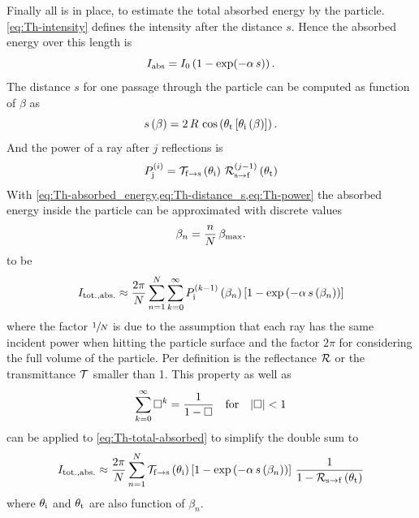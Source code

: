 Finally all is in place, to estimate the total absorbed energy by the particle. 
\cref{eq:Th-intensity} defines the intensity after the distance $s$. Hence the 
absorbed energy over this length is
\begin{equation}
    I_{\mathrm{abs}} = I_{0} \left( 1 - \exp(-\alpha\,s) \right).
    \label{eq:Th-absorbed_energy}
\end{equation}
The distance $s$ for one passage through the particle can be computed as 
function of $\beta$ as
\begin{equation}
  s\left( \beta \right) = 2\,R\,\cos\left( \theta_{\mathrm{t}}\left[ \theta_{\mathrm{i}}\left( 
    \beta \right) \right]
    \right).
    \label{eq:Th-distance_s}
\end{equation}
And the power of a ray after $j$ reflections is
\begin{equation}
  P_{\mathrm{j}}^{(i)} =
  \mathcal{T}_{\mathrm{f}\rightarrow\mathrm{s}}\left( \theta_{\mathrm{i}} \right) \,
  \mathcal{R}^{(j-1)}_{\mathrm{s}\rightarrow\mathrm{f}}\left( \theta_{\mathrm{t}} \right)
  \label{eq:Th-power}
\end{equation}
With \cref{eq:Th-absorbed_energy,eq:Th-distance_s,eq:Th-power} the absorbed 
energy inside the particle can be approximated with discrete values
\begin{equation}
  \beta_{n} = \frac{n}{N}\,\beta_{\mathrm{max}}.
  \label{eq:Th-beta-disc}
\end{equation}
to be
\begin{equation}
  I_{\mathrm{tot.,abs.}} \approx
  \frac{2\pi}{N}
  \sum\limits_{n=1}^{N}
  \sum\limits_{k=0}^{\infty}P_{\mathrm{i}}^{(k-1)}\left( \beta_{n} \right)\left[ 1 - 
  \exp\left( -\alpha\,s\left( \beta_{n} \right) \right) \right]
  \label{eq:Th-total-absorbed}
\end{equation}
where the factor $\sfrac{1}{N}$ is due to the assumption that each ray has the 
same incident power when hitting the particle surface and the factor $2\pi$ for 
considering the full volume of the particle. Per definition is the reflectance 
$\mathcal{R}$ or the transmittance $\mathcal{T}$ smaller than 1. This property as 
well as
\begin{equation}
  \sum\limits^{\infty}_{k=0} \Box^{k} = \frac{1}{1-\Box}
  \quad\text{for}\quad\abs{\Box} < 1
\end{equation}
can be applied to \cref{eq:Th-total-absorbed} to simplify the double sum to
\begin{equation}
  I_{\mathrm{tot.,abs.}} \approx
  \frac{2\pi}{N}
  \sum\limits_{n=1}^{N}
  \mathcal{T}_{\mathrm{f}\rightarrow\mathrm{s}}\left( \theta_{\mathrm{i}} \right)
  \left[ 1 - \exp\left( -\alpha\,s\left( \beta_{n} \right) \right) \right]
\,\frac{1}{1-\mathcal{R}_{\mathrm{s}\rightarrow\mathrm{f}}\left( \theta_{\mathrm{t}} \right)}
  \label{eq:Th-total-absorbed-simp}
\end{equation}
where $\theta_{\mathrm{i}}$ and $\theta_{\mathrm{t}}$ are also function of $\beta_{n}$.

